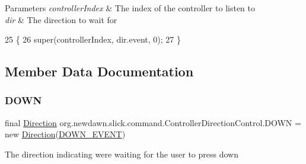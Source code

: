 \begin{DoxyParams}{Parameters}
{\em controller\+Index} & The index of the controller to listen to \\
\hline
{\em dir} & The direction to wait for \\
\hline
\end{DoxyParams}

\begin{DoxyCode}
25                                                                           \{
26         super(controllerIndex, dir.event, 0);
27     \}
\end{DoxyCode}


\subsection{Member Data Documentation}
\mbox{\label{classorg_1_1newdawn_1_1slick_1_1command_1_1_controller_direction_control_a6317f20fc356ebcb571e0a6a9a8b2797}} 
\subsubsection{\texorpdfstring{D\+O\+WN}{DOWN}}
{\footnotesize\ttfamily final \mbox{\hyperlink{classorg_1_1newdawn_1_1slick_1_1command_1_1_controller_direction_control_1_1_direction}{Direction}} org.\+newdawn.\+slick.\+command.\+Controller\+Direction\+Control.\+D\+O\+WN = new \mbox{\hyperlink{classorg_1_1newdawn_1_1slick_1_1command_1_1_controller_direction_control_1_1_direction}{Direction}}(\mbox{\hyperlink{classorg_1_1newdawn_1_1slick_1_1command_1_1_controller_control_a8bb2b5bc9aec486088eda6e6f925c06d}{D\+O\+W\+N\+\_\+\+E\+V\+E\+NT}})\hspace{0.3cm}{\ttfamily [static]}}

The direction indicating we\textquotesingle{}re waiting for the user to press down \mbox{\label{classorg_1_1newdawn_1_1slick_1_1command_1_1_controller_direction_control_a6bc25db895c93e0e0f31dc0a16395423}} 
